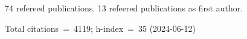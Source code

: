 74 refereed publications. 13 refeered publications as first author.

Total citations~=~4119; h-index~=~35 (2024-06-12)